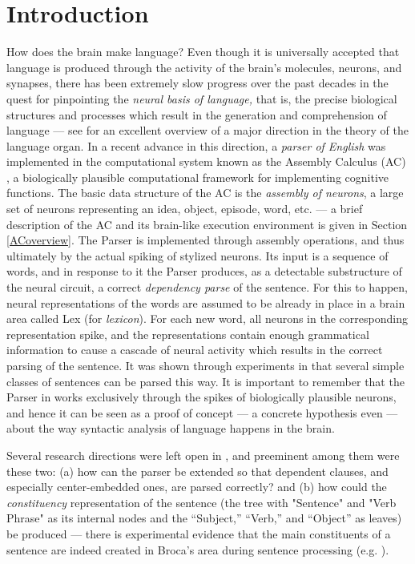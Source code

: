 \documentclass[11pt]{article}
\begin{document}
\section{Introduction}
How does the brain make language?  Even though it is universally accepted that language is produced through the activity of the brain's molecules, neurons, and synapses, there has been extremely slow progress over the past decades in the quest for pinpointing the {\em neural basis of language,} that is, the precise biological structures and processes which result in the generation and comprehension of language --- see \citet{Friederici} for an excellent overview of a major direction in the theory of the language organ.  In a recent advance in this direction, a {\em parser of English} was implemented \cite{Parser} in the computational system known as the Assembly Calculus (AC) \cite{PNAS}, a biologically plausible computational framework for implementing cognitive functions.  The basic data structure of the AC is the {\em assembly of neurons}, a large set of neurons representing an idea, object, episode, word, etc. --- a brief description of the AC and its brain-like execution environment is given in Section \ref{ACoverview}.  The Parser is implemented through assembly operations, and thus ultimately by the actual spiking of stylized neurons.  Its input is a sequence of words, and in response to it the Parser produces, as a detectable substructure of the neural circuit, a correct {\em dependency parse} of the sentence. For this to happen, neural representations of the words are assumed to be already in place in a brain area called {\sc Lex} (for {\em lexicon}\/). For each new word, all neurons in the corresponding representation spike, and the representations contain enough grammatical information to cause a cascade of neural activity which results in the correct parsing of the sentence.  It was shown through experiments in \citet{Parser} that several simple classes of sentences can be parsed this way.  It is important to remember that the Parser in \citet{Parser} works exclusively through the spikes of biologically plausible neurons, and hence it can be seen as a proof of concept --- a concrete hypothesis even --- about the way syntactic analysis of language happens in the brain.

Several research directions were left open in \citet{Parser}, and preeminent among them were these two: (a) how can the parser be extended so that dependent clauses, and especially center-embedded ones, are parsed correctly? and (b) how could the {\em constituency} representation of the sentence (the tree with "Sentence" and "Verb Phrase" as its internal nodes and the ``Subject,'' ``Verb,'' and ``Object'' as leaves) be produced --- there is experimental evidence that the main constituents of a sentence are indeed created in Broca's area during sentence processing (e.g. \citet{ZF}). 
\end{document}
